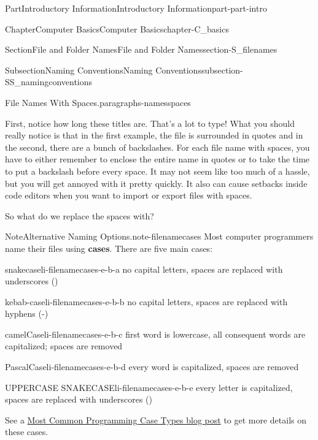 \documentclass[oneside,10pt,]{book}
\newcommand{\terminology}[1]{\textbf{#1}}
\begin{document}
\begin{partptx}{Part}{Introductory Information}{}{Introductory Information}{}{}{part-part-intro}
\begin{chapterptx}{Chapter}{Computer Basics}{}{Computer Basics}{}{}{chapter-C_basics}
\begin{sectionptx}{Section}{File and Folder Names}{}{File and Folder Names}{}{}{section-S_filenames}
\begin{subsectionptx}{Subsection}{Naming Conventions}{}{Naming Conventions}{}{}{subsection-SS_namingconventions}
\begin{paragraphs}{File Names With Spaces.}{paragraphs-namesspaces}
\begin{quote}
\end{quote}
First, notice how long these titles are. That's a lot to type! What you should really notice is that in the first example, the file is surrounded in quotes and in the second, there are a bunch of backslashes. For each file name with spaces, you have to either remember to enclose the entire name in quotes or to take the time to put a backslash before every space. It may not seem like too much of a hassle, but you will get annoyed with it pretty quickly. It also can cause setbacks inside code editors when you want to import or export files with spaces.%
\par
So what do we replace the spaces with?%
\begin{note}{Note}{Alternative Naming Options.}{note-filenamecases}%
%
%
%
Most computer programmers name their files using \terminology{cases}. There are five main cases:%
\begin{descriptionlist}
\begin{dlimedium}{snake\textunderscore{}case}{li-filenamecases-e-b-a}%
no capital letters, spaces are replaced with underscores (\textunderscore{})%
\end{dlimedium}%
\begin{dlimedium}{kebab-case}{li-filenamecases-e-b-b}%
no capital letters, spaces are replaced with hyphens (-)%
\end{dlimedium}%
\begin{dlimedium}{camelCase}{li-filenamecases-e-b-c}%
first word is lowercase, all consequent words are capitalized; spaces are removed%
\end{dlimedium}%
\begin{dlimedium}{PascalCase}{li-filenamecases-e-b-d}%
every word is capitalized, spaces are removed%
\end{dlimedium}%
\begin{dlimedium}{UPPER\textunderscore{}CASE\textunderscore{} SNAKE\textunderscore{}CASE}{li-filenamecases-e-b-e}%
every letter is capitalized, spaces are replaced with underscores (\textunderscore{})%
\end{dlimedium}%
\end{descriptionlist}
See a \href{https://chaseadams.io/posts/most-common-programming-case-types/}{Most Common Programming Case Types blog post}\footnotemark{} to get more details on these cases.%
\end{note}
%

\end{paragraphs}
\end{subsectionptx}
\end{sectionptx}
\end{chapterptx}
\end{partptx}
\end{document}

